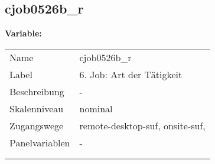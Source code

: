 	
	
	\subsection{cjob0526b\_r}
	\label{subSection:cjob0526b_r}

	\noindent\textbf{Variable:}\\
		\begin{tabular}{lL{11.3cm}}
			\label{tableVariable:cjob0526b_r}
			Name & cjob0526b\_r \\
			Label & 6. Job: Art der Tätigkeit \\
			Beschreibung & - \\
			Skalenniveau & nominal \\
			Zugangswege &
				remote-desktop-suf,
				onsite-suf,
 \\
			Panelvariablen & -
			 \\
			 \\
 \\
		\end{tabular}






